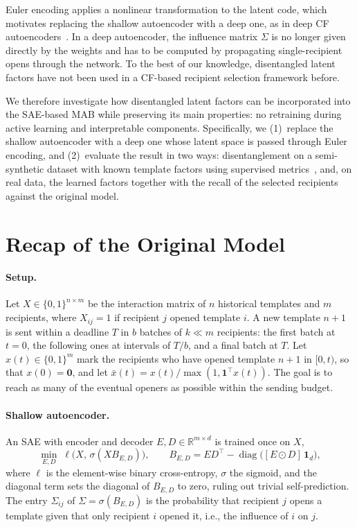 \documentclass[sigconf]{acmart}
\begin{document}
Euler encoding applies a nonlinear transformation to the latent code, which
motivates replacing the shallow autoencoder with a deep one, as in deep CF
autoencoders~\cite{liang2018variational}. In a deep autoencoder, the influence
matrix $\Sigma$ is no longer given directly by the weights and has to be
computed by propagating single-recipient opens through the network.
To the best of our knowledge, disentangled latent factors have not been used in
a CF-based recipient selection framework before.

We therefore investigate how disentangled latent factors can be incorporated
into the SAE-based MAB while preserving its main properties: no retraining
during active learning and interpretable components. Specifically, we
(1)~replace the shallow autoencoder with a deep one whose latent space is
passed through Euler encoding, and (2)~evaluate the result in two ways:
disentanglement on a semi-synthetic dataset with known template factors using
supervised metrics~\cite{carbonneau2022measuring}, and, on real data, the
learned factors together with the recall of the selected recipients against the
original model.

\section{Recap of the Original Model}\label{sec:recap}

\paragraph{Setup.} Let $X \in \{0,1\}^{n \times m}$ be the interaction matrix of
$n$ historical templates and $m$ recipients, where $X_{ij} = 1$ if recipient $j$
opened template $i$. A new template $n+1$ is sent within a deadline $T$ in $b$
batches of $k \ll m$ recipients: the first batch at $t = 0$, the following ones
at intervals of $T/b$, and a final batch at $T$. Let $x(t) \in \{0,1\}^m$ mark
the recipients who have opened template $n+1$ in $[0,t)$, so that $x(0) = \mathbf{0}$,
and let $\bar{x}(t) = x(t) / \max(1, \mathbf{1}^{\top} x(t))$. The goal is to
reach as many of the eventual openers as possible within the sending budget.

\paragraph{Shallow autoencoder.} An SAE with encoder and decoder
$E, D \in \mathbb{R}^{m \times d}$ is trained once on $X$,
\begin{equation}\label{eq:sae}
  \min_{E,D}\; \ell\bigl(X,\, \sigma(X B_{E,D})\bigr), \qquad
  B_{E,D} = E D^{\top} - \operatorname{diag}\bigl([E \odot D]\,\mathbf{1}_d\bigr),
\end{equation}
where $\ell$ is the element-wise binary cross-entropy, $\sigma$ the sigmoid, and
the diagonal term sets the diagonal of $B_{E,D}$ to zero, ruling out trivial
self-prediction. The entry $\Sigma_{ij}$ of $\Sigma = \sigma(B_{E,D})$ is the
probability that recipient $j$ opens a template given that only recipient $i$
opened it, i.e., the influence of $i$ on $j$.
\end{document}
